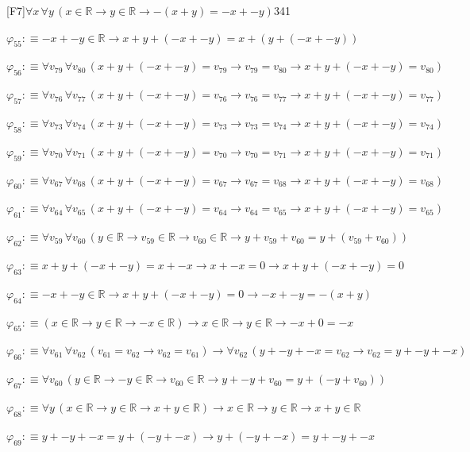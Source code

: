 \begin{fullproof}{[F7]}{$\forall x\,\forall y\,(x \in \mathbb{R} \to y \in \mathbb{R} \to -(x + y) = -x + -y)$}{341}
\begin{abbrevlist}
\item $\varphi_{55} :\equiv -x + -y \in \mathbb{R} \to x + y + (-x + -y) = x + (y + (-x + -y))$
\item $\varphi_{56} :\equiv \forall v_{79}\,\forall v_{80}\,(x + y + (-x + -y) = v_{79} \to v_{79} = v_{80} \to x + y + (-x + -y) = v_{80})$
\item $\varphi_{57} :\equiv \forall v_{76}\,\forall v_{77}\,(x + y + (-x + -y) = v_{76} \to v_{76} = v_{77} \to x + y + (-x + -y) = v_{77})$
\item $\varphi_{58} :\equiv \forall v_{73}\,\forall v_{74}\,(x + y + (-x + -y) = v_{73} \to v_{73} = v_{74} \to x + y + (-x + -y) = v_{74})$
\item $\varphi_{59} :\equiv \forall v_{70}\,\forall v_{71}\,(x + y + (-x + -y) = v_{70} \to v_{70} = v_{71} \to x + y + (-x + -y) = v_{71})$
\item $\varphi_{60} :\equiv \forall v_{67}\,\forall v_{68}\,(x + y + (-x + -y) = v_{67} \to v_{67} = v_{68} \to x + y + (-x + -y) = v_{68})$
\item $\varphi_{61} :\equiv \forall v_{64}\,\forall v_{65}\,(x + y + (-x + -y) = v_{64} \to v_{64} = v_{65} \to x + y + (-x + -y) = v_{65})$
\item $\varphi_{62} :\equiv \forall v_{59}\,\forall v_{60}\,(y \in \mathbb{R} \to v_{59} \in \mathbb{R} \to v_{60} \in \mathbb{R} \to y + v_{59} + v_{60} = y + (v_{59} + v_{60}))$
\item $\varphi_{63} :\equiv x + y + (-x + -y) = x + -x \to x + -x = 0 \to x + y + (-x + -y) = 0$
\item $\varphi_{64} :\equiv -x + -y \in \mathbb{R} \to x + y + (-x + -y) = 0 \to -x + -y = -(x + y)$
\item $\varphi_{65} :\equiv (x \in \mathbb{R} \to y \in \mathbb{R} \to -x \in \mathbb{R}) \to x \in \mathbb{R} \to y \in \mathbb{R} \to -x + 0 = -x$
\item $\varphi_{66} :\equiv \forall v_{61}\,\forall v_{62}\,(v_{61} = v_{62} \to v_{62} = v_{61}) \to \forall v_{62}\,(y + -y + -x = v_{62} \to v_{62} = y + -y + -x)$
\item $\varphi_{67} :\equiv \forall v_{60}\,(y \in \mathbb{R} \to -y \in \mathbb{R} \to v_{60} \in \mathbb{R} \to y + -y + v_{60} = y + (-y + v_{60}))$
\item $\varphi_{68} :\equiv \forall y\,(x \in \mathbb{R} \to y \in \mathbb{R} \to x + y \in \mathbb{R}) \to x \in \mathbb{R} \to y \in \mathbb{R} \to x + y \in \mathbb{R}$
\item $\varphi_{69} :\equiv y + -y + -x = y + (-y + -x) \to y + (-y + -x) = y + -y + -x$

\end{abbrevlist}
\end{fullproof}
